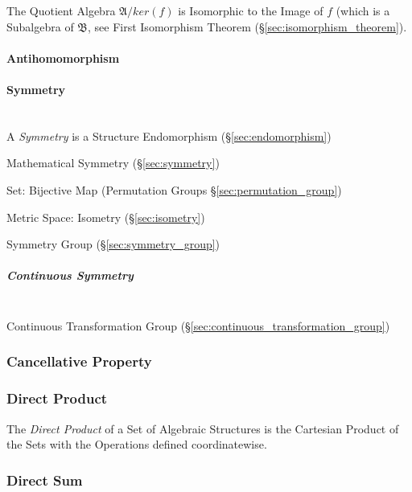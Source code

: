The Quotient Algebra $\mathfrak{A}/ker(f)$ is Isomorphic to the Image
of $f$ (which is a Subalgebra of $\mathfrak{B}$, see First Isomorphism
Theorem (\S\ref{sec:isomorphism_theorem}).



\paragraph{Antihomomorphism}\label{sec:antihomomorphism}

\paragraph{Symmetry}\label{sec:structure_symmetry}
\hfill \\

A \emph{Symmetry} is a Structure Endomorphism
(\S\ref{sec:endomorphism})

Mathematical Symmetry (\S\ref{sec:symmetry})

Set: Bijective Map (Permutation Groups \S\ref{sec:permutation_group})

Metric Space: Isometry (\S\ref{sec:isometry})

Symmetry Group (\S\ref{sec:symmetry_group})



\subparagraph{Continuous Symmetry}\label{sec:continuous_symmetry}
\hfill \\

Continuous Transformation Group
(\S\ref{sec:continuous_transformation_group})



\subsubsection{Cancellative Property}\label{sec:cancellative_property}

\subsubsection{Direct Product}\label{sec:direct_product}

The \emph{Direct Product} of a Set of Algebraic Structures is the
Cartesian Product of the Sets with the Operations defined
coordinatewise.



\subsubsection{Direct Sum}\label{sec:direct_sum}

